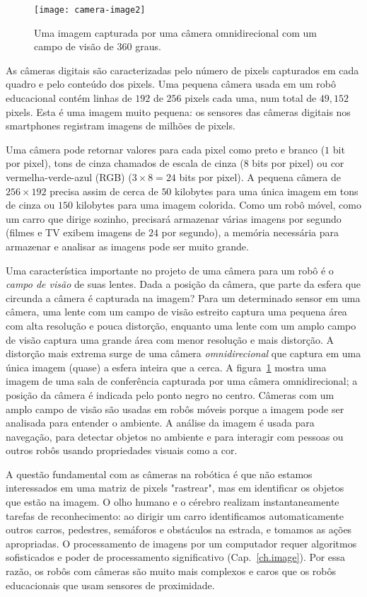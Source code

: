 \begin{figure}
\texttt{[image: camera-image2]}
\caption{Uma imagem capturada por uma câmera omnidirecional com um campo de visão de 360 graus.}\label{fig.camera}
\end{figure}

As câmeras digitais são caracterizadas pelo número de pixels capturados em cada quadro e pelo conteúdo dos pixels. Uma pequena câmera usada em um robô educacional contém linhas de $192$ de $256$ pixels cada uma, num total de $49,\!152$ pixels. Esta é uma imagem muito pequena: os sensores das câmeras digitais nos smartphones registram imagens de milhões de pixels.

Uma câmera pode retornar valores para cada pixel como preto e branco ($1$ bit por pixel), tons de cinza chamados de escala de cinza ($8$ bits por pixel) ou cor vermelha-verde-azul (RGB) ($3\times 8=24$ bits por pixel). A pequena câmera de $256\times 192$ precisa assim de cerca de $50$ kilobytes para uma única imagem em tons de cinza ou $150$ kilobytes para uma imagem colorida. Como um robô móvel, como um carro que dirige sozinho, precisará armazenar várias imagens por segundo (filmes e TV exibem imagens de $24$ por segundo), a memória necessária para armazenar e analisar as imagens pode ser muito grande.

Uma característica importante no projeto de uma câmera para um robô é o \emph{campo de visão} de suas lentes. Dada a posição da câmera, que parte da esfera que circunda a câmera é capturada na imagem? Para um determinado sensor em uma câmera, uma lente com um campo de visão estreito captura uma pequena área com alta resolução e pouca distorção, enquanto uma lente com um amplo campo de visão captura uma grande área com menor resolução e mais distorção. A distorção mais extrema surge de uma câmera \emph{omnidirecional} que captura em uma única imagem (quase) a esfera inteira que a cerca. A figura~\ref{fig.camera} mostra uma imagem de uma sala de conferência capturada por uma câmera omnidirecional; a posição da câmera é indicada pelo ponto negro no centro. Câmeras com um amplo campo de visão são usadas em robôs móveis porque a imagem pode ser analisada para entender o ambiente. A análise da imagem é usada para navegação, para detectar objetos no ambiente e para interagir com pessoas ou outros robôs usando propriedades visuais como a cor.

A questão fundamental com as câmeras na robótica é que não estamos interessados em uma matriz de pixels "rastrear", mas em identificar os objetos que estão na imagem. O olho humano e o cérebro realizam instantaneamente tarefas de reconhecimento: ao dirigir um carro identificamos automaticamente outros carros, pedestres, semáforos e obstáculos na estrada, e tomamos as ações apropriadas. O processamento de imagens por um computador requer algoritmos sofisticados e poder de processamento significativo (Cap.~\ref{ch.image}). Por essa razão, os robôs com câmeras são muito mais complexos e caros que os robôs educacionais que usam sensores de proximidade.

